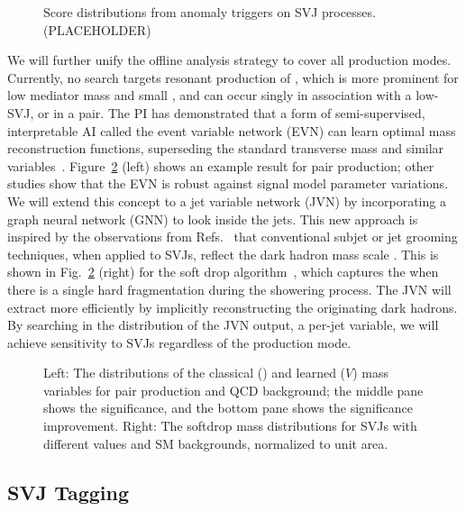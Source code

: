 \begin{figure}[htb!]
\centering
{}
\caption{Score distributions from anomaly triggers on SVJ processes. (PLACEHOLDER)}
\label{fig:svjanomaly}
\end{figure}

We will further unify the offline analysis strategy to cover all production modes.
Currently, no search targets resonant production of \Pbifun, which is more prominent for low mediator mass and small \sbifun, and can occur singly in association with a low-\pt SVJ, or in a pair.
The PI has demonstrated that a form of semi-supervised, interpretable AI called the event variable network (EVN)
can learn optimal mass reconstruction functions, superseding the standard transverse mass and similar variables~\cite{Pedro:2023sdp}.
Figure~\ref{fig:svjmass} (left) shows an example result for \Pbifun pair production; other studies show that the EVN is robust against signal model parameter variations.
We will extend this concept to a jet variable network (JVN) by incorporating a graph neural network (GNN) to look inside the jets.
This new approach is inspired by the observations from Refs.~\cite{Strassler:2008fv,CMS:2021dzg} that conventional subjet or jet grooming techniques, when applied to SVJs, reflect the dark hadron mass scale \mdark.
This is shown in Fig.~\ref{fig:svjmass} (right) for the soft drop algorithm~\cite{Larkoski:2014wba}, which captures the \mdark when there is a single hard fragmentation during the showering process.
The JVN will extract \mdark more efficiently by implicitly reconstructing the originating dark hadrons.
By searching in the distribution of the JVN output, a per-jet variable, we will achieve sensitivity to SVJs regardless of the production mode.

\begin{figure}[htb!]
\centering
{}
\caption{Left: The distributions of the classical (\mTii) and learned ($V$) mass variables for \Pbifun pair production and QCD background; the middle pane shows the significance, and the bottom pane shows the significance improvement. Right: The softdrop mass distributions for SVJs with different \mdark values and SM backgrounds, normalized to unit area.}
\label{fig:svjmass}
\end{figure}

\subsection{SVJ Tagging}\label{subsec:tagging}

